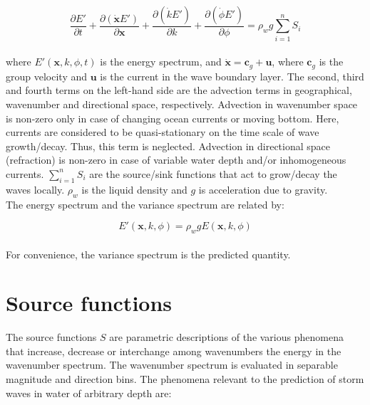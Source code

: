 \documentclass[letterpaper]{article}
\numberwithin{equation}{section}
\begin{document}
\begin{equation}
\dfrac{\partial E'}{\partial t} + 
\dfrac{\partial (\dot{\textbf{x}}E')}{\partial \textbf{x}} + 
\dfrac{\partial (\dot{k}E')}{\partial k} + 
\dfrac{\partial (\dot{\phi}E')}{\partial \phi} = 
\rho_{w}g\displaystyle\sum_{i=1}^{n}S_{i} 
\label{energy_balance}
\end{equation}
\\
where $E'(\textbf{x},k,\phi,t)$ is the energy spectrum, and $\dot{\textbf{x}}=\textbf{c}_{g}+\textbf{u}$, 
where $\textbf{c}_{g}$ is the group velocity and $\textbf{u}$ is the current in the wave boundary layer. 
The second, third and fourth terms on the left-hand side are the advection terms
in geographical, wavenumber and directional space, respectively.
Advection in wavenumber space is non-zero only in case of changing ocean currents or moving bottom.
Here, currents are considered to be quasi-stationary on the time scale of wave growth/decay.
Thus, this term is neglected.
Advection in directional space (refraction) is non-zero in case of variable water depth 
and/or inhomogeneous currents. $\displaystyle\sum_{i=1}^{n}S_{i}$ are the source/sink functions 
that act to grow/decay the waves locally.
$\rho_{w}$ is the liquid density and $g$ is acceleration due to gravity.\\

The energy spectrum and the variance spectrum are related by:

\begin{equation}
E'(\textbf{x},k,\phi)=\rho_{w}gE(\textbf{x},k,\phi)
\end{equation}
\\
For convenience, the variance spectrum is the predicted quantity.

\newpage
\section{Source functions}

The source functions $S$ are parametric descriptions of the various phenomena that increase, decrease or interchange among wavenumbers the energy in the wavenumber spectrum. 
The wavenumber spectrum is evaluated in separable magnitude and direction bins. 
The phenomena relevant to the prediction of storm waves in water of arbitrary depth are: \\
\end{document}
